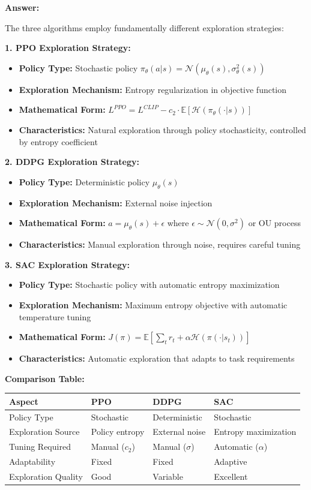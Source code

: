 \documentclass[12pt]{article}
\begin{document}
{{{\textbf{Answer:}

The three algorithms employ fundamentally different exploration strategies:

\textbf{1. PPO Exploration Strategy:}
\begin{itemize}
    \item \textbf{Policy Type:} Stochastic policy $\pi_\theta(a|s) = \mathcal{N}(\mu_\theta(s), \sigma_\theta^2(s))$
    \item \textbf{Exploration Mechanism:} Entropy regularization in objective function
    \item \textbf{Mathematical Form:} $L^{PPO} = L^{CLIP} - c_2 \cdot \mathbb{E}[\mathcal{H}(\pi_\theta(\cdot|s))]$
    \item \textbf{Characteristics:} Natural exploration through policy stochasticity, controlled by entropy coefficient
\end{itemize}

\textbf{2. DDPG Exploration Strategy:}
\begin{itemize}
    \item \textbf{Policy Type:} Deterministic policy $\mu_\theta(s)$
    \item \textbf{Exploration Mechanism:} External noise injection
    \item \textbf{Mathematical Form:} $a = \mu_\theta(s) + \epsilon$ where $\epsilon \sim \mathcal{N}(0, \sigma^2)$ or OU process
    \item \textbf{Characteristics:} Manual exploration through noise, requires careful tuning
\end{itemize}

\textbf{3. SAC Exploration Strategy:}
\begin{itemize}
    \item \textbf{Policy Type:} Stochastic policy with automatic entropy maximization
    \item \textbf{Exploration Mechanism:} Maximum entropy objective with automatic temperature tuning
    \item \textbf{Mathematical Form:} $J(\pi) = \mathbb{E}[\sum_t r_t + \alpha \mathcal{H}(\pi(\cdot|s_t))]$
    \item \textbf{Characteristics:} Automatic exploration that adapts to task requirements
\end{itemize}

\textbf{Comparison Table:}
\begin{table}[h]
\centering
\begin{tabular}{|l|l|l|l|}
\hline
\textbf{Aspect} & \textbf{PPO} & \textbf{DDPG} & \textbf{SAC} \\
\hline
Policy Type & Stochastic & Deterministic & Stochastic \\
Exploration Source & Policy entropy & External noise & Entropy maximization \\
Tuning Required & Manual ($c_2$) & Manual ($\sigma$) & Automatic ($\alpha$) \\
Adaptability & Fixed & Fixed & Adaptive \\
Exploration Quality & Good & Variable & Excellent \\
\hline
\end{tabular}
\end{table}

}}}
\end{document}
